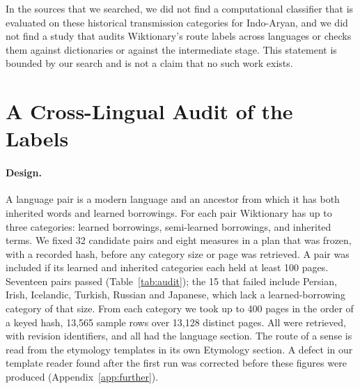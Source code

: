 \documentclass[11pt]{article}
\begin{document}
In the sources that we searched, we did not find a computational classifier that is evaluated on these historical transmission categories for Indo-Aryan, and we did not find a study that audits Wiktionary's route labels across languages or checks them against dictionaries or against the intermediate stage. This statement is bounded by our search and is not a claim that no such work exists.

\section{A Cross-Lingual Audit of the Labels}
\label{sec:audit}

\paragraph{Design.} A language pair is a modern language and an ancestor from which it has both inherited words and learned borrowings. For each pair Wiktionary has up to three categories: learned borrowings, semi-learned borrowings, and inherited terms. We fixed 32 candidate pairs and eight measures in a plan that was frozen, with a recorded hash, before any category size or page was retrieved. A pair was included if its learned and inherited categories each held at least 100 pages. Seventeen pairs passed (Table~\ref{tab:audit}); the 15 that failed include Persian, Irish, Icelandic, Turkish, Russian and Japanese, which lack a learned-borrowing category of that size. From each category we took up to 400 pages in the order of a keyed hash, 13,565 sample rows over 13,128 distinct pages. All were retrieved, with revision identifiers, and all had the language section. The route of a sense is read from the etymology templates in its own Etymology section. A defect in our template reader found after the first run was corrected before these figures were produced (Appendix~\ref{app:further}).
\end{document}
